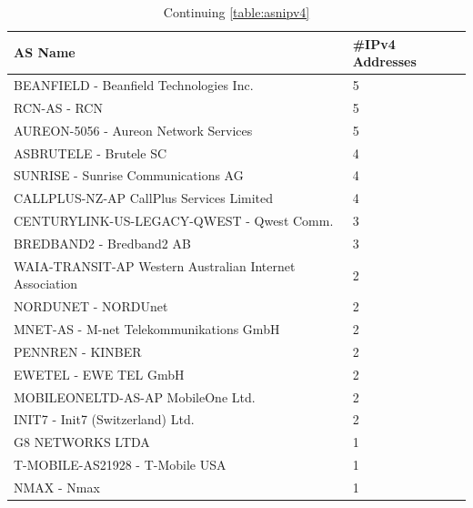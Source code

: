 \begin{table}[!h]
	\centering
	\caption{Continuing \cref{table:asnipv4}}
	\label{table:asn2ipv4}
	\begin{tabular}{lp{3cm}}
  		\toprule
  		\textbf{AS Name} & \textbf{\#IPv4 Addresses} \\ 
  		\midrule
  		BEANFIELD - Beanfield Technologies Inc.              &                              5  \\
		RCN-AS - RCN                                      &                                 5  \\
		AUREON-5056 - Aureon Network Services               &                               5  \\
		ASBRUTELE - Brutele SC                                &                             4  \\
		SUNRISE - Sunrise Communications AG                   &                             4  \\
		CALLPLUS-NZ-AP CallPlus Services Limited                &                           4  \\
		CENTURYLINK-US-LEGACY-QWEST - Qwest Comm.      &                   3  \\
		BREDBAND2 - Bredband2 AB                                   &                        3  \\
		WAIA-TRANSIT-AP Western Australian Internet Association          &                  2  \\
		NORDUNET - NORDUnet                                          &                      2  \\
		MNET-AS - M-net Telekommunikations GmbH                &                            2  \\
		PENNREN - KINBER                                        &                           2  \\
		EWETEL - EWE TEL GmbH                                   &                           2  \\
		MOBILEONELTD-AS-AP MobileOne Ltd.    &    2  \\
		INIT7 - Init7 (Switzerland) Ltd.                                  &                 2  \\
		G8 NETWORKS LTDA                                         &                          1  \\
		T-MOBILE-AS21928 - T-Mobile USA                         &                           1  \\
		NMAX - Nmax                                              &                          1  \\

\end{tabular}
\end{table}
